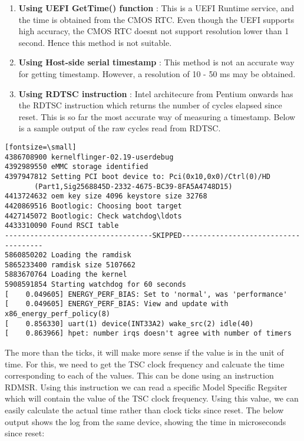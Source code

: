 \begin{enumerate}
	\item \textbf{Using UEFI GetTime() function} :
		This is a UEFI Runtime service, and the time is obtained from the CMOS RTC.
		Even though the UEFI supports high accuracy, the CMOS RTC doesnt not support
		resolution lower than 1 second. Hence this method is not suitable.
	\item \textbf{Using Host-side serial timestamp} :
		This method is not an accurate way for getting timestamp.
		However, a resolution of 10 - 50 ms may be obtained.
	\item \textbf{Using RDTSC instruction} :
		Intel architecure from Pentium onwards has the RDTSC instruction
		which returns the number of cycles elapsed since reset. This is so
		far the most accurate way of measuring a timestamp. Below is a
		sample output of the raw cycles read from RDTSC.	
\end{enumerate}

\begin{verbatim}[fontsize=\small]
4386708900 kernelflinger-02.19-userdebug
4392989550 eMMC storage identified
4397947812 Setting PCI boot device to: Pci(0x10,0x0)/Ctrl(0)/HD
	   (Part1,Sig2568845D-2332-4675-BC39-8FA5A4748D15)
4413724632 oem key size 4096 keystore size 32768
4420869516 Bootlogic: Choosing boot target
4427145072 Bootlogic: Check watchdog\ldots
4433310090 Found RSCI table
-----------------------------------SKIPPED-------------------------------------
5860850202 Loading the ramdisk
5865233400 ramdisk size 5107662
5883670764 Loading the kernel
5908591854 Starting watchdog for 60 seconds
[    0.049605] ENERGY_PERF_BIAS: Set to 'normal', was 'performance'
[    0.049605] ENERGY_PERF_BIAS: View and update with x86_energy_perf_policy(8)
[    0.856330] uart(1) device(INT33A2) wake_src(2) idle(40)
[    0.863966] hpet: number irqs doesn't agree with number of timers
\end{verbatim}

The more than the ticks, it will make more sense if the value is in the unit of time.
For this, we need to get the TSC clock frequency and calcuate the time corresponding
to each of the values. This can be done using an instruction RDMSR. Using this
instruction we can read a specific Model Specific Regsiter which will contain the value
of the TSC clock frequency. Using this value, we can easily calculate the actual time
rather than clock ticks since reset. The below output shows the log from the same
device, showing the time in microseconds since reset:

